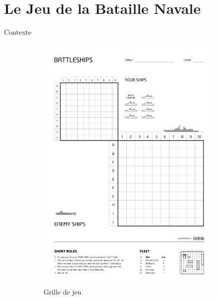 \section{Le Jeu de la Bataille Navale}
	
	\begin{frame}{Contexte}
	    \begin{figure}
		    \begin{subfigure}{.42\textwidth}
    		    \centering
                \includegraphics[width=.9\linewidth]{images/grillebn.jpg}
                \caption*{Grille de jeu}
                \label{fig:grillejeu}
            \end{subfigure}
            \begin{subfigure}{.56\textwidth}
                \centering

\end{subfigure}
\end{figure}
\end{frame}
